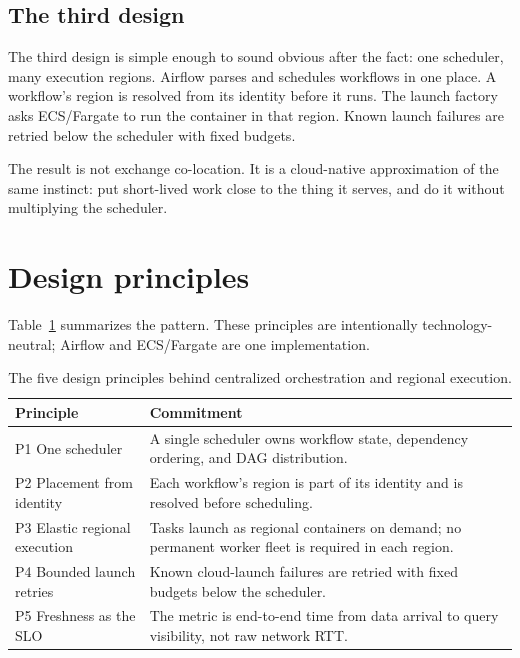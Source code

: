 \documentclass[11pt, reqno]{amsart}
\begin{document}
\subsection{The third design}

The third design is simple enough to sound obvious after the fact: one scheduler, many execution regions. Airflow parses and schedules workflows in one place. A workflow's region is resolved from its identity before it runs. The launch factory asks ECS/Fargate to run the container in that region. Known launch failures are retried below the scheduler with fixed budgets.

The result is not exchange co-location. It is a cloud-native approximation of the same instinct: put short-lived work close to the thing it serves, and do it without multiplying the scheduler.

\section{Design principles}
\label{sec:principles}

Table~\ref{tab:principles} summarizes the pattern. These principles are intentionally technology-neutral; Airflow and ECS/Fargate are one implementation.

\begin{table}[H]
\centering
\small
\begin{tabularx}{\textwidth}{lX}
\toprule
\textbf{Principle} & \textbf{Commitment} \\
\midrule
P1 One scheduler & A single scheduler owns workflow state, dependency ordering, and DAG distribution. \\
P2 Placement from identity & Each workflow's region is part of its identity and is resolved before scheduling. \\
P3 Elastic regional execution & Tasks launch as regional containers on demand; no permanent worker fleet is required in each region. \\
P4 Bounded launch retries & Known cloud-launch failures are retried with fixed budgets below the scheduler. \\
P5 Freshness as the SLO & The metric is end-to-end time from data arrival to query visibility, not raw network RTT. \\
\bottomrule
\end{tabularx}
\caption{The five design principles behind centralized orchestration and regional execution.}
\label{tab:principles}
\end{table}
\end{document}
